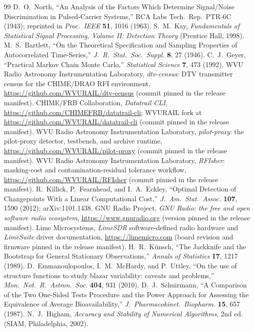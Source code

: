 \begin{thebibliography}{99}
 D.~O.~North, ``An Analysis of the Factors Which Determine Signal/Noise Discrimination in Pulsed-Carrier Systems,'' RCA Labs Tech.\ Rep.\ PTR-6C (1943); reprinted in \emph{Proc.\ IEEE} \textbf{51}, 1016 (1963).
 S.~M.~Kay, \emph{Fundamentals of Statistical Signal Processing, Volume II: Detection Theory} (Prentice Hall, 1998).
 M.~S.~Bartlett, ``On the Theoretical Specification and Sampling Properties of Autocorrelated Time-Series,'' \emph{J.~R.~Stat.~Soc.~Suppl.} \textbf{8}, 27 (1946).
 C.~J.~Geyer, ``Practical Markov Chain Monte Carlo,'' \emph{Statistical Science} \textbf{7}, 473 (1992).
 WVU Radio Astronomy Instrumentation Laboratory, \emph{dtv-census}: DTV transmitter census for the CHIME/DRAO RFI environment, \url{https://github.com/WVURAIL/dtv-census} (commit pinned in the release manifest).
 CHIME/FRB Collaboration, \emph{Datatrail CLI}, \url{https://github.com/CHIMEFRB/datatrail-cli}; WVURAIL fork at \url{https://github.com/WVURAIL/datatrail-cli} (commit pinned in the release manifest).
 WVU Radio Astronomy Instrumentation Laboratory, \emph{pilot-proxy}: the pilot-proxy detector, testbench, and archive runtime, \url{https://github.com/WVURAIL/pilot-proxy} (commit pinned in the release manifest).
 WVU Radio Astronomy Instrumentation Laboratory, \emph{RFIsher}: masking-cost and contamination-residual tolerance workflow, \url{https://github.com/WVURAIL/RFIsher} (commit pinned in the release manifest).
 R.~Killick, P.~Fearnhead, and I.~A.~Eckley, ``Optimal Detection of Changepoints With a Linear Computational Cost,'' \emph{J.\ Am.\ Stat.\ Assoc.} \textbf{107}, 1590 (2012); arXiv:1101.1438.
 GNU Radio Project, \emph{GNU Radio: the free and open software radio ecosystem}, \url{https://www.gnuradio.org} (version pinned in the release manifest).
 Lime Microsystems, \emph{LimeSDR} software-defined radio hardware and \emph{LimeSuite} driver documentation, \url{https://limemicro.com} (board revision and firmware pinned in the release manifest).
 H.~R.~K\"unsch, ``The Jackknife and the Bootstrap for General Stationary Observations,'' \emph{Annals of Statistics} \textbf{17}, 1217 (1989).
 D.~Emmanoulopoulos, I.~M.~McHardy, and P.~Uttley, ``On the use of structure functions to study blazar variability: caveats and problems,'' \emph{Mon.~Not.~R.~Astron.~Soc.} \textbf{404}, 931 (2010).
 D.~J.~Schuirmann, ``A Comparison of the Two One-Sided Tests Procedure and the Power Approach for Assessing the Equivalence of Average Bioavailability,'' \emph{J.~Pharmacokinet.~Biopharm.} \textbf{15}, 657 (1987).
 N.~J.~Higham, \emph{Accuracy and Stability of Numerical Algorithms}, 2nd ed. (SIAM, Philadelphia, 2002).


\end{thebibliography}
